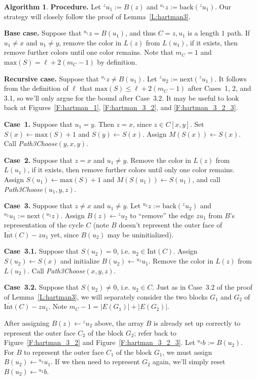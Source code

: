 \documentclass[12pt,letterpaper]{article}
\newcommand{\adj}[2]{{}^{#1}{#2}}
\newcommand{\nxt}{\text{next}}
\newcommand{\bck}{\text{back}}
\newcommand{\graphinto}{\text{Int}}
\newcommand{\graphintc}{\overline{\text{Int}}}
\theoremstyle{plain}
\theoremstyle{definition}
\theoremstyle{break}
\newtheorem{algorithm}[lemma]{Algorithm}     %
\begin{document}
\begin{algorithm}
\textbf{Procedure.} Let $\adj{z}{u_1}:= B(z)$ and
$\adj{u_1}{z}:=\bck(\adj{z}{u_1})$. Our strategy
will closely follow the proof of Lemma~\ref{L:hartman3}.

\textbf{Base case.} Suppose that $\adj{u_1}{z}=B(u_1)$, and thus $C=z,u_1$
is a length $1$ path. If $u_1\ne x$ and $u_1\ne y$, remove the
color in $L(z)$ from $L(u_1)$, if it exists, then remove further colors
until one color remains. Note that
$m_C=1$ and $\text{max}(S)=\ell + 2(m_C-1)$ by definition.

\textbf{Recursive case.} Suppose that $\adj{u_1}{z}\ne B(u_1)$.
Let $\adj{z}{u_2}:=\nxt(\adj{z}{u_1})$. It follows from the
definition of $\ell$
that $\text{max}(S)\le\ell+2(m_C-1)$ after Cases~1, 2,
and 3.1, so we'll only argue for the bound
after Case~3.2.
It may be useful to look back at
Figures~\ref{F:hartman_1}, \ref{F:hartman_3_2}, and
\ref{F:hartman_3_2_3}.

\textbf{Case~1.} Suppose that $u_1=y$. Then $z=x$, since $z\in C[x,y]$.
Set $S(x)\leftarrow \text{max}(S)+1$ and
$S(y)\leftarrow S(x)$.
Assign $M(S(x))\leftarrow S(x)$.
Call \emph{Path3Choose}$(y, x, y)$.

\textbf{Case~2.} Suppose that $z=x$ and $u_1\ne y$. 
Remove the color in $L(z)$ from $L(u_1)$, if it exists, then remove
further colors until only one color remains.
Assign $S(u_1)\leftarrow \text{max}(S)+1$
and $M(S(u_1))\leftarrow S(u_1)$,
and call \emph{Path3Choose}$(u_1, y, z)$.

\textbf{Case~3.} Suppose that $z\ne x$ and $u_1\ne y$.
Let $\adj{u_2}{z}:=\bck(\adj{z}{u_2})$ and
$\adj{u_2}{u_1}:=\nxt(\adj{u_2}{z})$.
Assign $B(z)\leftarrow\adj{z}{u_2}$ to ``remove'' the
edge $zu_1$ from $B$'s representation of the cycle $C$ (note
$B$ doesn't
represent the outer face of $\graphintc(C)-zu_1$ yet, since
$B(u_2)$ may be uninitialized).

\textbf{Case~3.1.} Suppose that $S(u_2)=0$, i.e. $u_2\in
\graphinto(C)$. Assign $S(u_2)\leftarrow S(x)$ and initialize
$B(u_2)\leftarrow\adj{u_2}{u_1}$.
Remove the color in $L(z)$ from
$L(u_2)$. Call \emph{Path3Choose}$(x, y, z)$.

\textbf{Case~3.2.} Suppose that $S(u_2)\ne 0$, i.e. $u_2\in C$.
Just as in
Case~3.2 of the proof of Lemma~\ref{L:hartman3}, we will separately consider
the two blocks $G_1$ and $G_2$ of $\graphintc(C)-zu_1$.
Note $m_C-1=|E(G_1)|+|E(G_2)|$. 

After assigning $B(z)\leftarrow \adj{z}{u_2}$ above,
the array $B$ is already set up correctly to
represent the outer face $C_2$ of the
block $G_2$; refer back to Figure~\ref{F:hartman_3_2} and
Figure~\ref{F:hartman_3_2_3}.
Let $\adj{u_2}{b}:= B(u_2)$.
For $B$ to represent the outer face $C_1$ of the block $G_1$,
we must assign $B(u_2)\leftarrow\adj{u_2}{u_1}$. If
we then need to represent $G_2$ again, we'll simply reset
$B(u_2)\leftarrow\adj{u_2}{b}$.


\end{algorithm}
\end{document}
